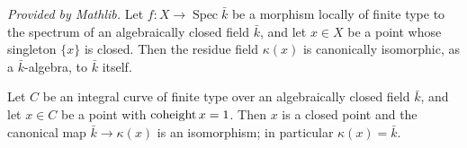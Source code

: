 \begin{lemma}
  \label{lem:residueFieldIsoBase_mathlib}
  \mathlibok
  \textit{Provided by Mathlib.}
  Let $f : X \to \operatorname{Spec}\bar k$ be a morphism locally of finite type to
  the spectrum of an algebraically closed field $\bar k$, and let $x \in X$ be a
  point whose singleton $\{x\}$ is closed.  Then the residue field $\kappa(x)$ is
  canonically isomorphic, as a $\bar k$-algebra, to $\bar k$ itself.
\end{lemma}

\begin{lemma}
  \label{lem:codimOne_point_residueField_eq_kbar}
  Let $C$ be an integral curve of finite type over an algebraically closed field
  $\bar k$, and let $x \in C$ be a point with $\operatorname{coheight} x = 1$.  Then $x$ is a
  closed point and the canonical map $\bar k \to \kappa(x)$ is an isomorphism; in
  particular $\kappa(x) = \bar k$.
\end{lemma}

